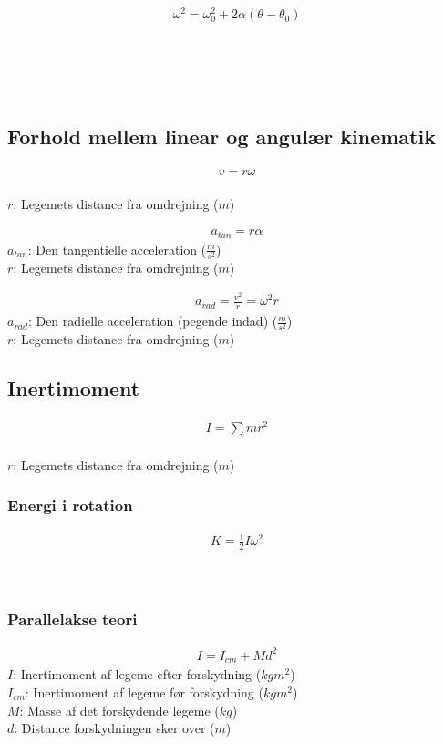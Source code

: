 	\begin{align}
		\omega^2=\omega_0^2+2\alpha(\theta-\theta_0)
	\end{align}
	\vinkelhast\\
	\vinkelhastbeg\\
	\vinkelacceleration\\
	\vinkel\\
	\vinkelbeg

\subsection{Forhold mellem linear og angulær kinematik}
	\begin{align}
		v=r\omega
	\end{align}
	\vel\\
	$r$: Legemets distance fra omdrejning ($m$)\\
	\vinkelhast

	\begin{align}
		a_{tan}=r\alpha
	\end{align}
	$a_{tan}$: Den tangentielle acceleration ($\frac{m}{s^2}$)\\
	$r$: Legemets distance fra omdrejning ($m$)\\
	\vinkelacceleration

	\begin{align}
		a_{rad}=\frac{v^2}{r}=\omega^2r
	\end{align}
	$a_{rad}$: Den radielle acceleration (pegende indad) ($\frac{m}{s^2}$)\\
	$r$: Legemets distance fra omdrejning ($m$)\\
	\vinkelhast

\subsection{Inertimoment}
	\begin{align}
		I=\sum mr^2
	\end{align}
	\inertimom\\
	\masse
	$r$: Legemets distance fra omdrejning ($m$)

	\subsubsection{Energi i rotation}
		\begin{align}
			K=\frac{1}{2}I\omega^2
		\end{align}
		\kinenergi\\
		\inertimom\\
		\vinkelhast

	\subsubsection{Parallelakse teori}
		\begin{align}
			I=I_{cm}+Md^2
		\end{align}
		$I$: Inertimoment af legeme efter forskydning ($kg m^2$)\\
		$I_{cm}$: Inertimoment af legeme før forskydning ($kg m^2$)\\
		$M$: Masse af det forskydende legeme ($kg$)\\
		$d$: Distance forskydningen sker over ($m$)